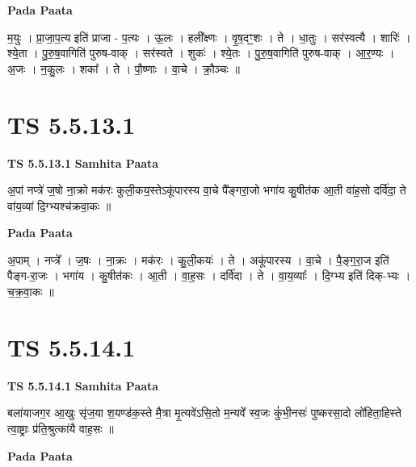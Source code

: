 \documentclass[17pt]{extarticle}
\begin{document}
\textbf{Pada Paata} \newline

म॒युः । प्रा॒जा॒प॒त्य इति॑ प्राजा - प॒त्यः । ऊ॒लः । हली᳚क्ष्णः । वृ॒ष॒दꣳ॒॒शः । ते । धा॒तुः । सर॑स्वत्यै । शारिः॑ । श्ये॒ता । पु॒रु॒ष॒वागिति॑ पुरुष-वाक् । सर॑स्वते । शुकः॑ । श्ये॒तः । पु॒रु॒ष॒वागिति॑ पुरुष-वाक् । आ॒र॒ण्यः । अ॒जः । न॒कु॒लः । शका᳚ । ते । पौ॒ष्णाः । वा॒चे । क्रौ॒ञ्चः ॥  \newline




\section*{ TS 5.5.13.1 }

\textbf{TS 5.5.13.1 } \newline
\textbf{Samhita Paata} \newline

अ॒पां नप्त्रे॑ ज॒षो ना॒क्रो मक॑रः कुली॒कय॒स्तेऽकू॑पारस्य वा॒चे पै᳚ङ्गरा॒जो भगा॑य कु॒षीत॑क आ॒ती वा॑ह॒सो दर्वि॑दा॒ ते वा॑य॒व्या॑ दि॒ग्भ्यश्च॑क्रवा॒कः ॥ \newline

\textbf{Pada Paata} \newline

अ॒पाम् । नप्त्रे᳚ । ज॒षः । ना॒क्रः । मक॑रः । कु॒ली॒कयः॑ । ते । अकू॑पारस्य । वा॒चे । पै॒ङ्ग॒रा॒ज इति॑ पैङ्ग-रा॒जः । भगा॑य । कु॒षीत॑कः । आ॒ती । वा॒ह॒सः । दर्वि॑दा । ते । वा॒य॒व्याः᳚ । दि॒ग्भ्य इति॑ दिक्-भ्यः । च॒क्र॒वा॒कः ॥  \newline




\section*{ TS 5.5.14.1 }

\textbf{TS 5.5.14.1 } \newline
\textbf{Samhita Paata} \newline

बला॑याजग॒र आ॒खुः सृ॑ज॒या श॒यण्ड॑क॒स्ते मै॒त्रा मृ॒त्यवे॑ऽसि॒तो म॒न्यवे᳚ स्व॒जः कुं॑भी॒नसः॑ पुष्करसा॒दो लो॑हिता॒हिस्ते त्वा॒ष्ट्राः प्र॑ति॒श्रुत्का॑यै वाह॒सः ॥ \newline

\textbf{Pada Paata} \newline
\end{document}
